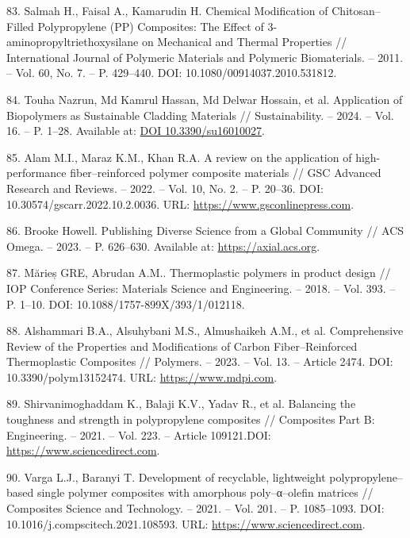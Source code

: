 \begin{references}
83. Salmah H., Faisal A., Kamarudin H. Chemical Modification of
Chitosan–Filled Polypropylene (PP) Composites: The Effect of
3-aminopropyltriethoxysilane on Mechanical and Thermal Properties //
Inter\-national Journal of Polymeric Materials and Polymeric
Biomaterials. – 2011. – Vol. 60, No. 7. – P. 429–440. DOI:
10.1080/00914037.2010.531812.

84. Touha Nazrun, Md Kamrul Hassan, Md Delwar Hossain, et
al. Application of Biopolymers as Sustainable Cladding Materials //
Sustainability. – 2024. – Vol. 16. – P. 1–28. Available
at: \href{https://doi.org/10.3390/su16010027}{DOI 10.3390/su16010027}.

85. Alam M.I., Maraz K.M., Khan R.A. A review on the application of
high-performance fiber–reinforced polymer composite materials // GSC
Advanced Research and Reviews. – 2022. – Vol. 10, No. 2. –
P. 20–36. DOI:
10.30574/gscarr.2022.10.2.0036. URL: \href{https://www.gsconlinepress.com/journals/gscarr/sites/default/files/GSCARR-2022-0036.pdf}{https://www.gsconlinepress.com}.

86. Brooke Howell. Publishing Diverse Science from a Global Community
// ACS Omega. – 2023. – P. 626–630. Available
at: \href{https://axial.acs.org/cross-disciplinary-concepts/acs-omega-global}{https://axial.acs.org}.

87. Mărieș GRE, Abrudan A.M.. Thermoplastic polymers in product design
// IOP Conference Series: Materials Science and Engineering. – 2018. –
Vol. 393. – P. 1–10. DOI: 10.1088/1757-899X/393/1/012118.

88. Alshammari B.A., Alsuhybani M.S., Almushaikeh A.M., et
al. Comprehensive Review of the Properties and Modifications of Carbon
Fiber–Reinforced Thermoplastic Composites // Polymers. – 2023. –
Vol. 13. – Article 2474. DOI:
10.3390/polym13152474. URL: \href{https://www.mdpi.com/2073-4360/13/15/2474}{https://www.mdpi.com}.

89. Shirvanimoghaddam K., Balaji K.V., Yadav R., et al. Balancing the
toughness and strength in polyprop\-ylene composites // Composites Part
B: Engineering. – 2021. – Vol. 223. – Article
109121.DOI: \\\href{https://www.sciencedirect.com/science/article/abs/pii/S1359836821001219}{https://www.sciencedirect.com}.

90. Varga L.J., Baranyi T. Development of recyclable, lightweight
polypropylene–based single polymer composites with amorphous
poly–α–olefin matrices // Composites Science and Technology. – 2021. –
Vol. 201. – P. 1085–1093. DOI:
10.1016/j.compscitech.2021.108593. URL: \href{https://www.sciencedirect.com/science/article/abs/pii/S0266353821005931}{https://www.sciencedirect.com}.


\end{references}
